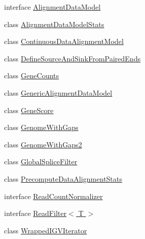 \begin{DoxyCompactItemize}
\item 
interface \hyperlink{interfacebroad_1_1pda_1_1seq_1_1segmentation_1_1_alignment_data_model}{Alignment\+Data\+Model}
\item 
class \hyperlink{classbroad_1_1pda_1_1seq_1_1segmentation_1_1_alignment_data_model_stats}{Alignment\+Data\+Model\+Stats}
\item 
class \hyperlink{classbroad_1_1pda_1_1seq_1_1segmentation_1_1_continuous_data_alignment_model}{Continuous\+Data\+Alignment\+Model}
\item 
class \hyperlink{classbroad_1_1pda_1_1seq_1_1segmentation_1_1_define_source_and_sink_from_paired_ends}{Define\+Source\+And\+Sink\+From\+Paired\+Ends}
\item 
class \hyperlink{classbroad_1_1pda_1_1seq_1_1segmentation_1_1_gene_counts}{Gene\+Counts}
\item 
class \hyperlink{classbroad_1_1pda_1_1seq_1_1segmentation_1_1_generic_alignment_data_model}{Generic\+Alignment\+Data\+Model}
\item 
class \hyperlink{classbroad_1_1pda_1_1seq_1_1segmentation_1_1_gene_score}{Gene\+Score}
\item 
class \hyperlink{classbroad_1_1pda_1_1seq_1_1segmentation_1_1_genome_with_gaps}{Genome\+With\+Gaps}
\item 
class \hyperlink{classbroad_1_1pda_1_1seq_1_1segmentation_1_1_genome_with_gaps2}{Genome\+With\+Gaps2}
\item 
class \hyperlink{classbroad_1_1pda_1_1seq_1_1segmentation_1_1_global_splice_filter}{Global\+Splice\+Filter}
\item 
class \hyperlink{classbroad_1_1pda_1_1seq_1_1segmentation_1_1_precompute_data_alignment_stats}{Precompute\+Data\+Alignment\+Stats}
\item 
interface \hyperlink{interfacebroad_1_1pda_1_1seq_1_1segmentation_1_1_read_count_normalizer}{Read\+Count\+Normalizer}
\item 
interface \hyperlink{interfacebroad_1_1pda_1_1seq_1_1segmentation_1_1_read_filter_3_01_t_01_4}{Read\+Filter$<$ T $>$}
\item 
class \hyperlink{classbroad_1_1pda_1_1seq_1_1segmentation_1_1_wrapped_i_g_v_iterator}{Wrapped\+I\+G\+V\+Iterator}
\end{DoxyCompactItemize}
